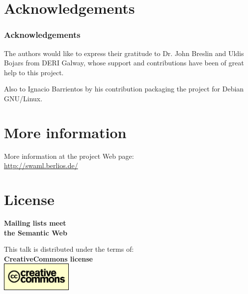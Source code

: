 \documentclass[spanish,notes=hide,16pt]{beamer}
\begin{document}
\appendix

\section{Acknowledgements}
\frame
{
  \frametitle{Acknowledgements}
  
  \begin{Large}
    The authors would like to express their gratitude to Dr. John Breslin and 
    Uldis Bojars from DERI Galway, whose support and contributions have been 
    of great help to this project. 
  \end{Large}

  \vspace{1cm}

  \begin{Large}
    Also to Ignacio Barrientos by his contribution packaging the project for 
    Debian GNU/Linux.
  \end{Large}
}

\section{More information}
\frame
{
  \begin{center}
    More information at the project Web page:\\
    \vspace{1cm}
    \LARGE{\href{http://swaml.berlios.de/}{http://swaml.berlios.de/}}\\
  \end{center}

}

\section{License}
\frame
{
  \begin{center}
    \LARGE{\textbf{Mailing lists meet\\the Semantic Web}}\\
    \vspace{1cm}
    \vspace{1cm}
    \begin{tiny}
	This talk is distributed under the terms of:\\
	\textbf{CreativeCommons license}\\
	\includegraphics[width=3.5cm]{images/creativecommons.png}
    \end{tiny}
  \end{center}
}
\end{document}
